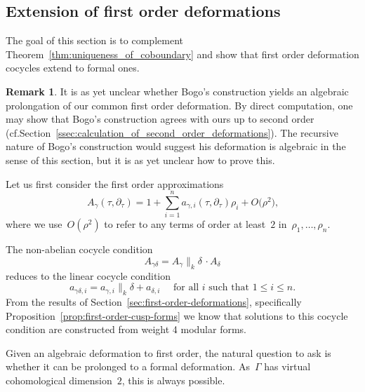\documentclass[10pt,a4paper]{article}
\numberwithin{equation}{section}
\theoremstyle{plain}
\theoremstyle{definition}
\newtheorem{remark}[theoremcounter]{Remark}
\newcommand{\tx}{\text}
\let\Ga\Gamma
\let\ga\gamma
\begin{document}
\subsection{Extension of first order deformations}
\label{ssec:extension_first_order_deformations}

The goal of this section is to complement Theorem~\ref{thm:uniqueness_of_coboundary} and show that first order deformation cocycles extend to formal ones.

\begin{remark}
It is as yet unclear whether Bogo's construction yields an algebraic prolongation of our common first order deformation. By direct computation, one may show that Bogo's construction agrees with ours up to second order (cf.\@ Section~\ref{ssec:calculation_of_second_order_deformations}). The recursive nature of Bogo's construction would suggest his deformation is algebraic in the sense of this section, but it is as yet unclear how to prove this.
\end{remark}

Let us first consider the first order approximations
\begin{equation*}
A_\ga(\tau, \partial_\tau)
=
1
+
\sum_{i=1}^n
a_{\ga,i}(\tau, \partial_\tau) \rho_i
+
O\bigl(\rho^2 \bigr)
\tx{,}
\end{equation*}
where we use~$O(\rho^2)$ to refer to any terms of order at least~$2$ in~$\rho_1,\ldots,\rho_n$.

The non-abelian cocycle condition
\begin{equation*}A_{\ga\delta} = A_{\ga}\big\|_k\delta\,\cdot A_\delta\end{equation*}
reduces to the linear cocycle condition
\begin{equation*}
a_{\ga\delta,i} = a_{\ga,i}\big\|_k\delta + a_{\delta,i}
\quad\text{ for all $i$ such that }1\leq i \leq n
\tx{.}
\end{equation*}
From the results of Section~\ref{sec:first-order-deformations}, specifically Proposition~\ref{prop:first-order-cusp-forms} we know that solutions to this cocycle condition are constructed from weight 4 modular forms.

Given an algebraic deformation to first order, the natural question to ask is whether it can be prolonged to a formal deformation. As~$\Ga$ has virtual cohomological dimension~$2$, this is always possible.
\end{document}
